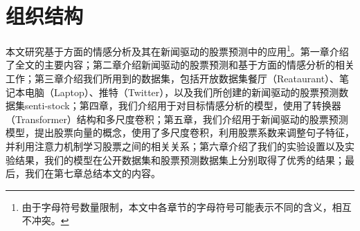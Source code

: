 \section{组织结构}

本文研究基于方面的情感分析及其在新闻驱动的股票预测中的应用\footnote{由于字母符号数量限制，本文中各章节的字母符号可能表示不同的含义，相互不冲突。}。第一章介绍了全文的主要内容；第二章介绍新闻驱动的股票预测和基于方面的情感分析的相关工作；第三章介绍我们所用到的数据集，包括开放数据集餐厅（Reataurant）、笔记本电脑（Laptop）、推特（Twitter），以及我们所创建的新闻驱动的股票预测数据集senti-stock；第四章，我们介绍用于对目标情感分析的模型，使用了转换器（Transformer）结构和多尺度卷积；第五章，我们介绍用于新闻驱动的股票预测模型，提出股票向量的概念，使用了多尺度卷积，利用股票系数来调整句子特征，并利用注意力机制学习股票之间的相关关系；第六章介绍了我们的实验设置以及实验结果，我们的模型在公开数据集和股票预测数据集上分别取得了优秀的结果；最后，我们在第七章总结本文的内容。